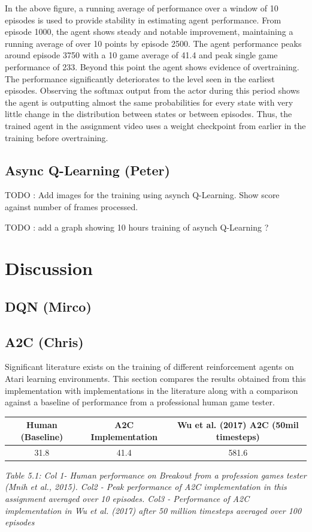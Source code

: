 \documentclass{article}
\begin{document}
In the above figure, a running average of performance over a window of 10 episodes is used to provide stability in estimating agent performance. From episode 1000, the agent shows steady and notable improvement, maintaining a running average of over 10 points by episode 2500. The agent performance peaks around episode 3750 with a 10 game average of 41.4 and peak single game performance of 233. Beyond this point the agent shows evidence of overtraining. The performance significantly deteriorates to the level seen in the earliest episodes. Observing the softmax output from the actor during this period shows the agent is outputting almost the same probabilities for every state with very little change in the distribution between states or between episodes. Thus, the trained agent in the assignment video uses a weight checkpoint from earlier in the training before overtraining.


\subsection{Async Q-Learning (Peter)}

TODO : Add images for the training using asynch Q-Learning.
Show score against number of frames processed.

TODO : add a graph showing 10 hours training of asynch Q-Learning ?

\section{Discussion}
    

\subsection{DQN (Mirco)}

\subsection{A2C (Chris)}

Significant literature exists on the training of different reinforcement agents on Atari learning environments. This section compares the results obtained from this implementation with implementations in the literature along with a comparison against a baseline of performance from a professional human game tester.

\begin{table}[h!]
\centering
\begin{tabular}{|c | c | c |} 
 \hline
 Human (Baseline) & A2C Implementation & Wu et al. (2017) A2C (50mil timesteps) \\ [0.5ex] 
 \hline
 31.8 & 41.4 & 581.6  \\ 
 \hline
\end{tabular}
\end{table}
\emph{Table 5.1: Col 1- Human performance on Breakout from a profession games tester (Mnih et al., 2015). Col2 - Peak performance of A2C implementation in this assignment averaged over 10 episodes. Col3 - Performance of A2C implementation in Wu et al. (2017)  after 50 million timesteps averaged over 100 episodes}
\end{document}
